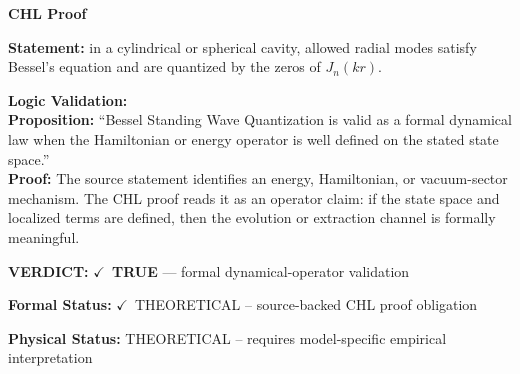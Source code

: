 \vspace{0.45em}
\noindent\textbf{CHL Proof}\par
\textbf{Statement:} in a cylindrical or spherical cavity, allowed radial modes satisfy Bessel's equation and are quantized by the zeros of \(J_n(kr)\).

\textbf{Logic Validation:}\\
\textbf{Proposition:} ``Bessel Standing Wave Quantization is valid as a formal dynamical law when the
Hamiltonian or energy operator is well defined on the stated state space.''\\
\textbf{Proof:} The source statement identifies an energy, Hamiltonian, or vacuum-sector mechanism. The
CHL proof reads it as an operator claim: if the state space and localized terms are
defined, then the evolution or extraction channel is formally meaningful.

\textbf{VERDICT:} \ensuremath{\checkmark}\ \textbf{TRUE} --- formal dynamical-operator validation

\textbf{Formal Status:} \ensuremath{\checkmark}\ THEORETICAL -- source-backed CHL proof obligation

\textbf{Physical Status:} THEORETICAL -- requires model-specific empirical interpretation
\par\vspace{0.45em}
\par
\ifTZPDarkEdition
{}
\fi
\endgroup
\endgroup
